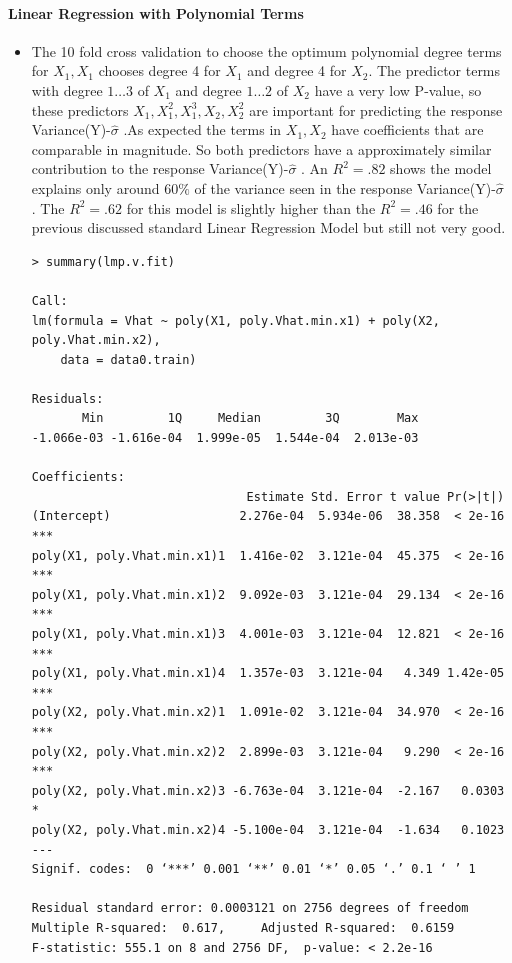 \documentclass[twoside,12pt]{article}
\begin{document}
\paragraph{Linear Regression with Polynomial Terms}
\begin{itemize}
\FloatBarrier
\item
The 10 fold cross validation to choose the optimum polynomial degree terms for $X_1,X_1$ chooses degree 4 for $X_1$ and degree 4 for $X_2$. The predictor terms with degree $1\dots 3$ of $X_1$ and degree $1 \dots 2$ of $X_2$ have a very low P-value, so these predictors $X_1,X_1^2,X_1^3,X_2,X_2^2$ are important for predicting the response Variance(Y)-$\hat{\sigma}$ .As expected the terms in $X_1,X_2$ have coefficients that are comparable in magnitude. So both predictors have a approximately similar contribution to the response Variance(Y)-$\hat{\sigma}$ . An $R^2=.82$ shows the model explains only around $60\%$ of the variance seen in the response Variance(Y)-$\hat{\sigma}$ . The $R^2=.62$ for this model is slightly higher than the $R^2=.46$ for the previous discussed standard Linear Regression Model but still not very good.
\begin{verbatim}
> summary(lmp.v.fit)

Call:
lm(formula = Vhat ~ poly(X1, poly.Vhat.min.x1) + poly(X2, poly.Vhat.min.x2), 
    data = data0.train)

Residuals:
       Min         1Q     Median         3Q        Max 
-1.066e-03 -1.616e-04  1.999e-05  1.544e-04  2.013e-03 

Coefficients:
                              Estimate Std. Error t value Pr(>|t|)    
(Intercept)                  2.276e-04  5.934e-06  38.358  < 2e-16 ***
poly(X1, poly.Vhat.min.x1)1  1.416e-02  3.121e-04  45.375  < 2e-16 ***
poly(X1, poly.Vhat.min.x1)2  9.092e-03  3.121e-04  29.134  < 2e-16 ***
poly(X1, poly.Vhat.min.x1)3  4.001e-03  3.121e-04  12.821  < 2e-16 ***
poly(X1, poly.Vhat.min.x1)4  1.357e-03  3.121e-04   4.349 1.42e-05 ***
poly(X2, poly.Vhat.min.x2)1  1.091e-02  3.121e-04  34.970  < 2e-16 ***
poly(X2, poly.Vhat.min.x2)2  2.899e-03  3.121e-04   9.290  < 2e-16 ***
poly(X2, poly.Vhat.min.x2)3 -6.763e-04  3.121e-04  -2.167   0.0303 *  
poly(X2, poly.Vhat.min.x2)4 -5.100e-04  3.121e-04  -1.634   0.1023    
---
Signif. codes:  0 ‘***’ 0.001 ‘**’ 0.01 ‘*’ 0.05 ‘.’ 0.1 ‘ ’ 1

Residual standard error: 0.0003121 on 2756 degrees of freedom
Multiple R-squared:  0.617,     Adjusted R-squared:  0.6159 
F-statistic: 555.1 on 8 and 2756 DF,  p-value: < 2.2e-16



\end{verbatim}
\end{itemize}
\end{document}
